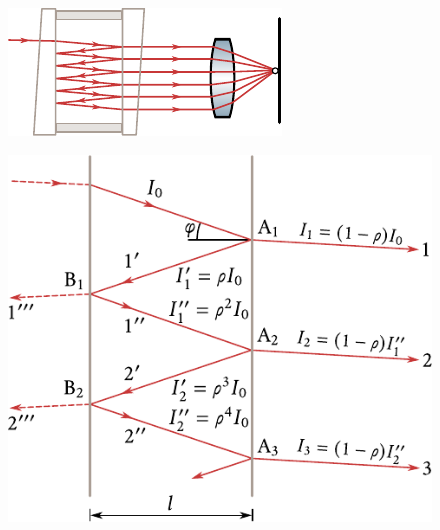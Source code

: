\begin{figure}[t]
	\begin{minipage}[t]{0.38\linewidth}
		\begin{center}
			\includegraphics[scale=1]{figures/ch_17/fig_17_20.pdf}
			\caption[]{}
			\label{fig:17_20}
		\end{center}
	\end{minipage}
	\hfill{ }%
	\begin{minipage}[t]{0.62\linewidth}
		\begin{center}
			\includegraphics[scale=0.85]{figures/ch_17/fig_17_21.pdf}
            \caption[]{}
			\label{fig:17_21}
		\end{center}
	\end{minipage}
\vspace{-0.4cm}
\end{figure}

